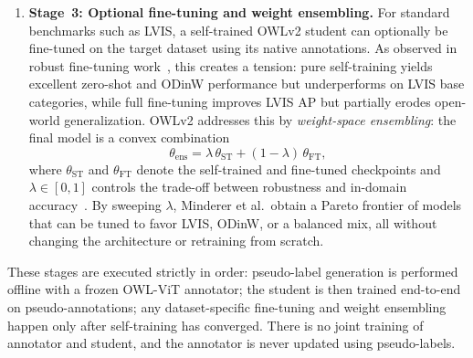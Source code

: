 \begin{enrichment}
\begin{enrichment}
\begin{enumerate}
			\item \textbf{Stage~3: Optional fine-tuning and weight ensembling.}
			For standard benchmarks such as LVIS, a self-trained OWLv2 student can optionally be fine-tuned on the target dataset using its native annotations.
			As observed in robust fine-tuning work~\cite{wortsman2022_robustfinetuning}, this creates a tension: pure self-training yields excellent zero-shot and ODinW performance but underperforms on LVIS base categories, while full fine-tuning improves LVIS AP but partially erodes open-world generalization.
			OWLv2 addresses this by \emph{weight-space ensembling}: the final model is a convex combination
			\[
			\theta_{\text{ens}} = \lambda\, \theta_{\text{ST}} + (1-\lambda)\, \theta_{\text{FT}},
			\]
			where $\theta_{\text{ST}}$ and $\theta_{\text{FT}}$ denote the self-trained and fine-tuned checkpoints and $\lambda \in [0,1]$ controls the trade-off between robustness and in-domain accuracy~\cite{minderer2024_owlvitv2,wortsman2022_robustfinetuning}.
			By sweeping $\lambda$, Minderer et al.\ obtain a Pareto frontier of models that can be tuned to favor LVIS, ODinW, or a balanced mix, all without changing the architecture or retraining from scratch.
		\end{enumerate}
		
		These stages are executed strictly in order: pseudo-label generation is performed offline with a frozen OWL-ViT annotator; the student is then trained end-to-end on pseudo-annotations; any dataset-specific fine-tuning and weight ensembling happen only after self-training has converged.
		There is no joint training of annotator and student, and the annotator is never updated using pseudo-labels.
		
	\end{enrichment}
	
	\begin{enrichment}
		\label{enr:chapter14_owlv2_pseudo_labels}
		

\end{enrichment}
\end{enrichment}

